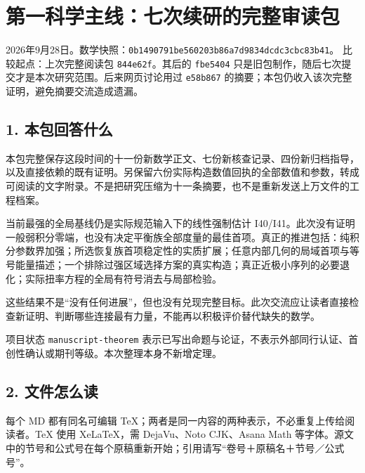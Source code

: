 \documentclass[
  10pt,
]{article}
\author{}
\date{}
\begin{document}
\hypertarget{ux7b2cux4e00ux79d1ux5b66ux4e3bux7ebfux4e03ux6b21ux7eedux7814ux7684ux5b8cux6574ux5ba1ux8bfbux5305}{%
\section{第一科学主线：七次续研的完整审读包}\label{ux7b2cux4e00ux79d1ux5b66ux4e3bux7ebfux4e03ux6b21ux7eedux7814ux7684ux5b8cux6574ux5ba1ux8bfbux5305}}

2026年9月28日。数学快照：\nolinkurl{0b1490791be560203b86a7d9834dcdc3cbc83b41}。
比较起点：上次完整阅读包 \texttt{844e62f}。其后的 \texttt{fbe5404}
只是旧包制作，随后七次提交才是本次研究范围。后来网页讨论用过
\texttt{e58b867} 的摘要；本包仍收入该次完整证明，避免摘要交流造成遗漏。

\hypertarget{ux672cux5305ux56deux7b54ux4ec0ux4e48}{%
\subsection{1.
本包回答什么}\label{ux672cux5305ux56deux7b54ux4ec0ux4e48}}

本包完整保存这段时间的十一份新数学正文、七份新核查记录、四份新归档指导，以及直接依赖的既有证明。另保留六份实际构造数值回执的全部数值和参数，转成可阅读的文字附录。不是把研究压缩为十一条摘要，也不是重新发送上万文件的工程档案。

当前最强的全局基线仍是实际规范输入下的线性强制估计
I40/I41。此次没有证明一般弱积分零端，也没有决定平衡族全部度量的最佳首项。真正的推进包括：纯积分参数界加强；所选恢复族首项稳定性的实质扩展；任意内部几何的局域首项与等号能量描述；一个排除过强区域选择方案的真实构造；真正近极小序列的必要退化；实际扭率方程的全局有符号消去与局部检验。

这些结果不是``没有任何进展''，但也没有兑现完整目标。此次交流应让读者直接检查新证明、判断哪些连接最有力量，不能再以积极评价替代缺失的数学。

项目状态 \texttt{manuscript-theorem}
表示已写出命题与论证，不表示外部同行认证、首创性确认或期刊等级。本次整理本身不新增定理。

\hypertarget{ux6587ux4ef6ux600eux4e48ux8bfb}{%
\subsection{2. 文件怎么读}\label{ux6587ux4ef6ux600eux4e48ux8bfb}}

每个 MD 都有同名可编辑
TeX；两者是同一内容的两种表示，不必重复上传给阅读者。TeX 使用
XeLaTeX，需 DejaVu、Noto CJK、Asana Math
等字体。源文中的节号和公式号在每个原稿重新开始；引用请写``卷号＋原稿名＋节号／公式号''。
\end{document}
